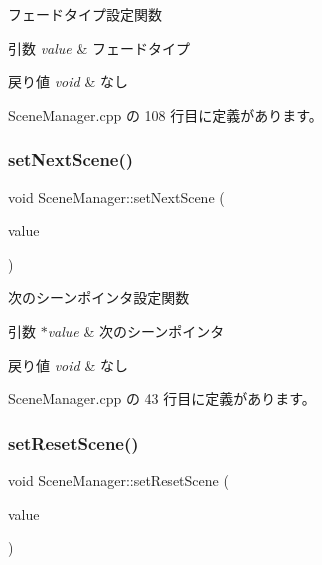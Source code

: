 フェードタイプ設定関数 


\begin{DoxyParams}{引数}
{\em value} & フェードタイプ \\
\hline
\end{DoxyParams}

\begin{DoxyRetVals}{戻り値}
{\em void} & なし \\
\hline
\end{DoxyRetVals}


 Scene\+Manager.\+cpp の 108 行目に定義があります。

\mbox{\label{class_scene_manager_a208cc1690dcb260ae7fb94d13118f6ce}} 
\subsubsection{\texorpdfstring{set\+Next\+Scene()}{setNextScene()}}
{\footnotesize\ttfamily void Scene\+Manager\+::set\+Next\+Scene (\begin{DoxyParamCaption}\item[{\mbox{\hyperlink{class_scene_base}{Scene\+Base}} $\ast$}]{value }\end{DoxyParamCaption})}



次のシーンポインタ設定関数 


\begin{DoxyParams}{引数}
{\em $\ast$value} & 次のシーンポインタ \\
\hline
\end{DoxyParams}

\begin{DoxyRetVals}{戻り値}
{\em void} & なし \\
\hline
\end{DoxyRetVals}


 Scene\+Manager.\+cpp の 43 行目に定義があります。

\mbox{\label{class_scene_manager_a3c3eb28c97fb0f5091aa26917dc2ecaf}} 
\subsubsection{\texorpdfstring{set\+Reset\+Scene()}{setResetScene()}}
{\footnotesize\ttfamily void Scene\+Manager\+::set\+Reset\+Scene (\begin{DoxyParamCaption}\item[{\mbox{\hyperlink{class_scene_base_1_1_state_base}{Scene\+Base\+::\+State\+Base}} $\ast$}]{value }\end{DoxyParamCaption})}




